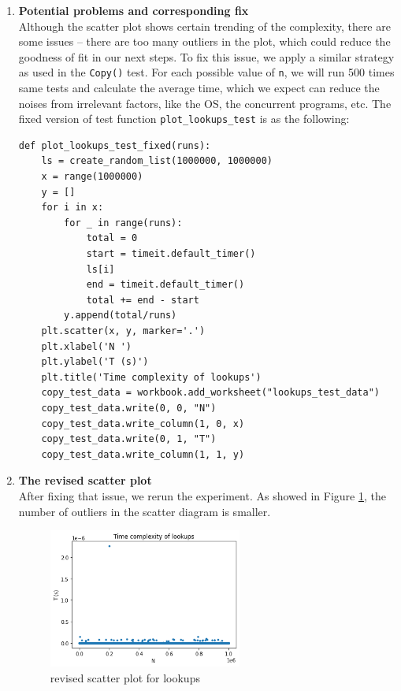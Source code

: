 \documentclass[12pt]{article}
\begin{document}
\begin{enumerate}[(1)]
\item \textbf{Potential problems and corresponding fix}\\
Although the scatter plot shows certain trending of the complexity, there are some issues \--- there are too many outliers in the plot, which could reduce the goodness of fit in our next steps. To fix this issue, we apply a similar strategy as used in the \verb|Copy()| test. For each possible value of \verb|n|, we will run 500 times same tests and calculate the average time, which we expect can reduce the noises from irrelevant factors, like the OS, the concurrent programs, etc. The fixed version of test function \verb|plot_lookups_test| is as the following:
\lstset{language=Python, basicstyle=\ttfamily\small, breaklines=true, showspaces=false,
  showstringspaces=false, breakatwhitespace=true}
\begin{lstlisting}
def plot_lookups_test_fixed(runs):
    ls = create_random_list(1000000, 1000000)
    x = range(1000000)
    y = []
    for i in x:
        for _ in range(runs):
            total = 0
            start = timeit.default_timer()
            ls[i]
            end = timeit.default_timer()
            total += end - start
        y.append(total/runs)
    plt.scatter(x, y, marker='.')
    plt.xlabel('N ')
    plt.ylabel('T (s)')
    plt.title('Time complexity of lookups')
    copy_test_data = workbook.add_worksheet("lookups_test_data")
    copy_test_data.write(0, 0, "N")
    copy_test_data.write_column(1, 0, x)
    copy_test_data.write(0, 1, "T")
    copy_test_data.write_column(1, 1, y)
\end{lstlisting}
\item \textbf{The revised scatter plot}\\
After fixing that issue, we rerun the experiment. As showed in Figure \ref{Figure: 3}, the number of outliers in the scatter diagram is smaller.

\begin{figure}[h!]
\centering
\includegraphics[width=0.6\textwidth,height=\textheight,keepaspectratio]{figure_3.png}
\caption{revised scatter plot for lookups}
\label{Figure: 3}
\end{figure}


\end{enumerate}
\end{document}
